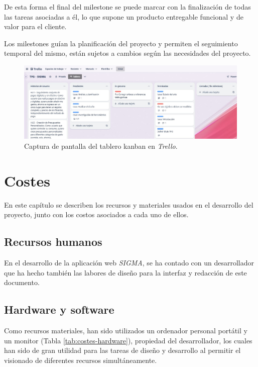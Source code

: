 De esta forma el final del milestone se puede marcar con la finalización de todas las tareas asociadas a él, lo que supone un producto entregable funcional y de valor para el cliente. 

Los milestones guían la planificación del proyecto y permiten el seguimiento temporal del mismo, están sujetos a cambios según las necesidades del proyecto.

\begin{figure}[ht!]
    \centering
    \includegraphics[width=\linewidth]{imagenes/tablero_kanban.jpg}
    \caption{Captura de pantalla del tablero kanban en \textit{Trello}.}
    \label{fig:tablero_kanban}
\end{figure}


\section{Costes}
En este capítulo se describen los recursos y materiales usados en el desarrollo del proyecto, junto con los costos asociados a cada uno de ellos.

\subsection{Recursos humanos}

En el desarrollo de la aplicación web \textit{SIGMA}, se ha contado con un desarrollador que ha hecho también las labores de diseño para la interfaz y redacción de este documento.

\subsection{Hardware y software}
Como recursos materiales, han sido utilizados un ordenador personal portátil y un monitor (Tabla \ref{tab:costes-hardware}),
propiedad del desarrollador, los cuales han sido de gran utilidad para las tareas de diseño y desarrollo al permitir el visionado de diferentes recursos simultáneamente.

